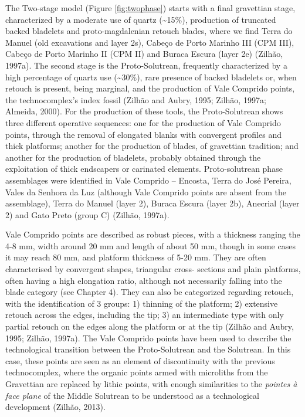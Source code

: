 \documentclass[12pt,twoside]{reedthesis}
\begin{document}
The Two-stage model (Figure \ref{fig:twophase}) starts with a final gravettian stage, characterized by a moderate use of quartz (\textasciitilde15\%), production of truncated backed bladelets and proto-magdalenian retouch blades, where we find Terra do Manuel (old excavations and layer 2s), Cabeço de Porto Marinho III (CPM III), Cabeço de Porto Marinho II (CPM II) and Buraca Escura (layer 2e) (Zilhão, 1997a). The second stage is the Proto-Solutrean, frequently characterized by a high percentage of quartz use (\textasciitilde30\%), rare presence of backed bladelets or, when retouch is present, being marginal, and the production of Vale Comprido points, the technocomplex's index fossil (Zilhão and Aubry, 1995; Zilhão, 1997a; Almeida, 2000). For the production of these tools, the Proto-Solutrean shows three different operative sequences: one for the production of Vale Comprido points, through the removal of elongated blanks with convergent profiles and thick platforms; another for the production of blades, of gravettian tradition; and another for the production of bladelets, probably obtained through the exploitation of thick endscapers or carinated elements. Proto-solutrean phase assemblages were identified in Vale Comprido -- Encosta, Terra do José Pereira, Vales da Senhora da Luz (although Vale Comprido points are absent from the assemblage), Terra do Manuel (layer 2), Buraca Escura (layer 2b), Anecrial (layer 2) and Gato Preto (group C) (Zilhão, 1997a).

Vale Comprido points are described as robust pieces, with a thickness ranging the 4-8 mm, width around 20 mm and length of about 50 mm, though in some cases it may reach 80 mm, and platform thickness of 5-20 mm. They are often characterised by convergent shapes, triangular cross- sections and plain platforms, often having a high elongation ratio, although not necessarily falling into the blade category (see Chapter 4). They can also be categorized regarding retouch, with the identification of 3 groups: 1) thinning of the platform; 2) extensive retouch across the edges, including the tip; 3) an intermediate type with only partial retouch on the edges along the platform or at the tip (Zilhão and Aubry, 1995; Zilhão, 1997a). The Vale Comprido points have been used to describe the technological transition between the Proto-Solutrean and the Solutrean. In this case, these points are seen as an element of discontinuity with the previous technocomplex, where the organic points armed with microliths from the Gravettian are replaced by lithic points, with enough similarities to the \emph{pointes à face plane} of the Middle Solutrean to be understood as a technological development (Zilhão, 2013).
\end{document}
